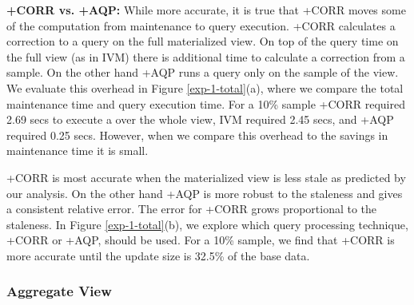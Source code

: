 \textbf{\svcnospace+CORR vs. \svcnospace+AQP:}
While more accurate, it is true that \svcnospace+CORR moves some of the computation from maintenance to query execution.
\svcnospace+CORR calculates a correction to a query on the full materialized view.
On top of the query time on the full view (as in IVM) there is additional time to calculate a correction from a sample.
On the other hand \svcnospace+AQP runs a query only on the sample of the view.
We evaluate this overhead in Figure \ref{exp-1-total}(a), where we compare the total maintenance time and query execution time.
For a 10\% sample \svcnospace+CORR required 2.69 secs to execute a \sumfunc over the whole view, IVM required 2.45 secs, and  \svcnospace+AQP required 0.25 secs.
However, when we compare this overhead to the savings in maintenance time it is small.


\svcnospace+CORR is most accurate when the materialized view is less stale as predicted by our analysis.
On the other hand \svcnospace+AQP is more robust to the staleness and gives a consistent relative error.
The error for \svcnospace+CORR grows proportional to the staleness.
In Figure \ref{exp-1-total}(b), we explore which query processing technique, \svcnospace+CORR or \svcnospace+AQP, should be used.
For a 10\% sample, we find that \svcnospace+CORR is more accurate until the update size is 32.5\% of the base data.



\iffalse
\subsubsection{Aggregate View}
\label{exp-datacube}

